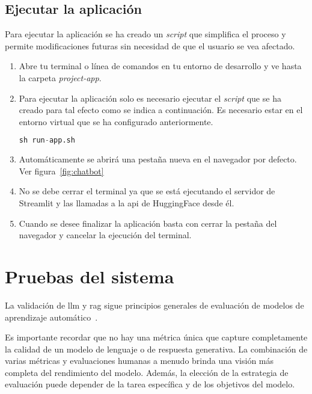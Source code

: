 \subsection{Ejecutar la aplicación}

Para ejecutar la aplicación se ha creado un \textit{script} que simplifica el proceso y permite modificaciones futuras sin necesidad de que el usuario se vea afectado.

\begin{enumerate}
\item Abre tu terminal o línea de comandos en tu entorno de desarrollo y ve hasta la carpeta \textit{project-app}.

\item Para ejecutar la aplicación solo es necesario ejecutar el \textit{script} que se ha creado para tal efecto como se indica a continuación. Es necesario estar en el entorno virtual que se ha configurado anteriormente.

\begin{lstlisting}[language=Python, caption=Ejecutar la aplicación.]
    sh run-app.sh
\end{lstlisting}

\item Automáticamente se abrirá una pestaña nueva en el navegador por defecto. Ver figura~\ref{fig:chatbot}

\item No se debe cerrar el terminal ya que se está ejecutando el servidor de Streamlit y las llamadas a la \acrshort{api} de HuggingFace desde él.

\item Cuando se desee finalizar la aplicación basta con cerrar la pestaña del navegador y cancelar la ejecución del terminal.  
\end{enumerate}


\section{Pruebas del sistema}

La validación de \acrshort{llm} y \acrshort{rag} sigue principios generales de evaluación de modelos de aprendizaje automático~\cite{schäfer2023empirical}.

Es importante recordar que no hay una métrica única que capture completamente la calidad de un modelo de lenguaje o de respuesta generativa. La combinación de varias métricas y evaluaciones humanas a menudo brinda una visión más completa del rendimiento del modelo. Además, la elección de la estrategia de evaluación puede depender de la tarea específica y de los objetivos del modelo.

